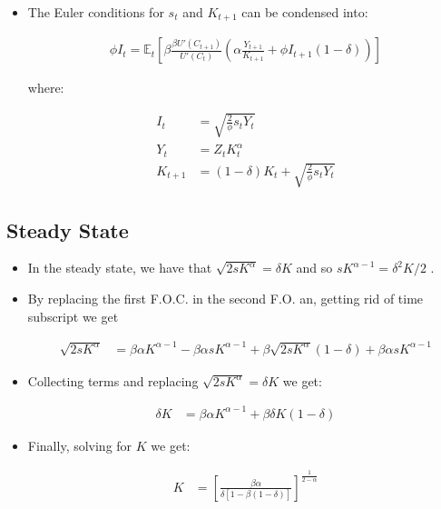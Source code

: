 \documentclass[11pt]{article}
\newcommand{\E}{\mathbb{E}}
\numberwithin{equation}{section}
\begin{document}
\begin{itemize}
 
 \item The Euler conditions for $s_{t}$ and $K_{t+1}$ can be condensed into:
 
 \begin{align*}
 \phi I_{t} = \E_t \left[ \beta \frac{\beta U'(C_{t+1})}{U'(C_t)} \left(\alpha \frac{Y_{t+1}}{K_{t+1}} + \phi I_{t+1} (1-\delta) \right) \right]
 \end{align*}
 
 where:
 
 \begin{align*}
 I_t & = \sqrt{\frac{2}{\phi} s_t Y_{t}} \\
 Y_t & = Z_t K^{\alpha}_t \\
 K_{t+1} & = (1-\delta) K_t + \sqrt{\frac{2}{\phi} s_t Y_t}
 \end{align*} 
 

\end{itemize}

	
	\subsection{Steady State}
	\begin{itemize}	
	\item In the steady state, we have that $\sqrt{2 s K^\alpha} = \delta K$ and so $s K^{\alpha-1} =\delta^2 K/2$ .
	
	\item By replacing the first F.O.C. in the second F.O. an, getting rid of time subscript we get
	
	\begin{align} \sqrt{2 s K^\alpha}& = \beta \alpha K^{\alpha-1}  - \beta \alpha s K^{\alpha-1} +\beta \sqrt{2 s K^\alpha} (1-\delta) + \beta \alpha s  K^{\alpha-1}
	\end{align}
	
	\item Collecting terms and replacing $\sqrt{2 s K^\alpha} = \delta K$ we get:
	
	\begin{align} \delta K & = \beta \alpha K^{\alpha-1} +\beta \delta K (1-\delta) 
	\end{align}
	
	\item Finally, solving for $K$ we get:
	
		\begin{align*}  K & = \left[\frac{\beta \alpha}{\delta[1-\beta(1-\delta)]} \right]^\frac{1}{2-\alpha} \end{align*}
	
	\end{itemize}
	
\end{document}
